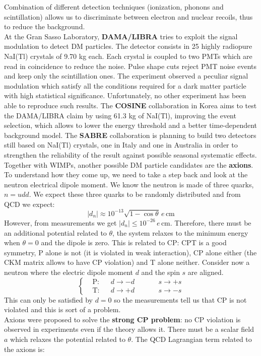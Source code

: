 \documentclass[10.75pt,a4paper,openright,bottom=2cm]{article}
\begin{document}
Combination of different detection techniques (ionization, phonons and scintillation) allows us to discriminate between electron and nuclear recoils, thus to reduce the background.\\
At the Gran Sasso Laboratory, \textbf{DAMA/LIBRA} tries to exploit the signal modulation to detect DM particles. The detector consists in 25 highly radiopure NaI(Tl) crystals of 9.70 kg each. Each crystal is coupled to two PMTs which are read in coincidence to reduce the noise. Pulse shape cuts reject PMT noise events and keep only the scintillation ones. The experiment observed a peculiar signal modulation which satisfy all the conditions required for a dark matter particle with high statistical significance. Unfortunately, no other experiment has been able to reproduce such results. The \textbf{COSINE} collaboration in Korea aims to test the DAMA/LIBRA claim by using 61.3 kg of NaI(Tl), improving the event selection, which allows to lower the energy threshold and a better time-dependent background model. The \textbf{SABRE} collaboration is planning to build two detectors still based on NaI(Tl) crystals, one in Italy and one in Australia in order to strengthen the reliability of the result against possible seasonal systematic effects.\\
Together with WIMPs, another possible DM particle candidates are the \textbf{axions}. To understand how they come up, we need to take a step back and look at the neutron electrical dipole moment. We know the neutron is made of three quarks, $n=udd$. We expect these three quarks to be randomly distributed and from QCD we expect:
\[
|d_n|\approx10^{-13}\sqrt{1-\cos\theta}\,e\,\text{cm}
\]
However, from measurements we get $|d_n|\le10^{-26}\,e$\,cm. Therefore, there must be an additional potential related to $\theta$, the system relaxes to the minimum energy when $\theta=0$ and the dipole is zero. This is related to CP: CPT is a good symmetry, P alone is not (it is violated in weak interaction), CP alone either (the CKM matrix allows to have CP violation) and T alone neither. Consider now a neutron where the electric dipole moment $d$ and the spin $s$ are aligned.
\[
\left\{
\begin{aligned}
&\text{P}:&&d\to-d \quad &&&s\to+s\\
&\text{T}:&&d\to+d \quad &&&s\to-s
\end{aligned}
\right.
\]
This can only be satisfied by $d=0$ so the measurements tell us that CP is not violated and this is sort of a problem.\\
Axions were proposed to solve the \textbf{strong CP problem}: no CP violation is observed in experiments even if the theory allows it. There must be a scalar field $a$ which relaxes the potential related to $\theta$. The QCD Lagrangian term related to the axions is:
\end{document}
